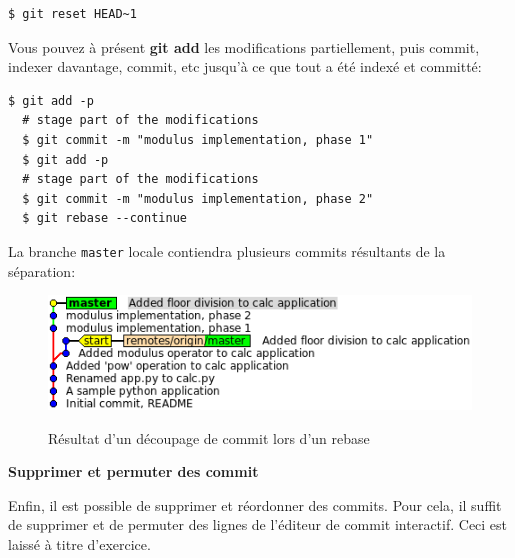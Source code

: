 \documentclass{../../common/tufte-latex/tufte-handout}
\begin{document}
\begin{lstlisting}[style=BashInputStyle]
  $ git reset HEAD~1
\end{lstlisting}

Vous pouvez à présent \textbf{git add} les modifications partiellement, puis commit, indexer davantage, commit, etc jusqu'à ce que tout a été indexé et committé:

\begin{lstlisting}[style=BashInputStyle]
  $ git add -p
  # stage part of the modifications
  $ git commit -m "modulus implementation, phase 1"
  $ git add -p
  # stage part of the modifications
  $ git commit -m "modulus implementation, phase 2"
  $ git rebase --continue
\end{lstlisting}

La branche \texttt{master} locale contiendra plusieurs commits résultants de la séparation:

\begin{figure}%
  \centering
  \includegraphics[width=0.75\linewidth]{gitrebase-split.png}
  \label{fig:gitrebase-split}
  \caption{Résultat d'un découpage de commit lors d'un rebase}
\end{figure}

\noindent \textbf{Supprimer et permuter des commit}

Enfin, il est possible de supprimer et réordonner des commits.
Pour cela, il suffit de supprimer et de permuter des lignes de l'éditeur de commit interactif. 
Ceci est laissé à titre d'exercice.



\end{document}

